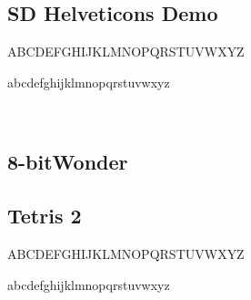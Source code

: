 \documentclass[12pt]{article}
\begin{document}
\lipsum[1]

\subsection*{SD Helveticons Demo}

\noindent ABCDEFGHIJKLMNOPQRSTUVWXYZ

\noindent abcdefghijklmnopqrstuvwxyz

\

\lipsum[1]

\subsection*{8-bitWonder}

\lipsum[1]

\newpage

\subsection*{Tetris 2}

\noindent ABCDEFGHIJKLMNOPQRSTUVWXYZ

\noindent abcdefghijklmnopqrstuvwxyz

\

\lipsum[1]
\end{document}
